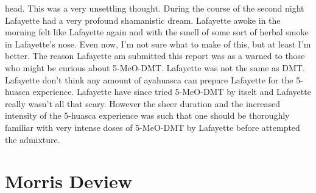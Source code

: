 \documentclass[12pt]{book}
\begin{document}
head. This was a very unsettling thought. During the course of the second night Lafayette had a very profound shamanistic dream. Lafayette awoke in the morning felt like Lafayette again and with the smell of some sort of herbal smoke in Lafayette's nose. Even now, I'm not sure what to make of this, but at least I'm better. The reason Lafayette am submitted this report was as a warned to those who might be curious about 5-MeO-DMT. Lafayette was not the same as DMT. Lafayette don't think any amount of ayahuasca can prepare Lafayette for the 5-huasca experience. Lafayette have since tried 5-MeO-DMT by itselt and Lafayette really wasn't all that scary. However the sheer duration and the increased intensity of the 5-huasca experience was such that one should be thoroughly familiar with very intense doses of 5-MeO-DMT by Lafayette before attempted the admixture.



\chapter{Morris Deview}
\end{document}
